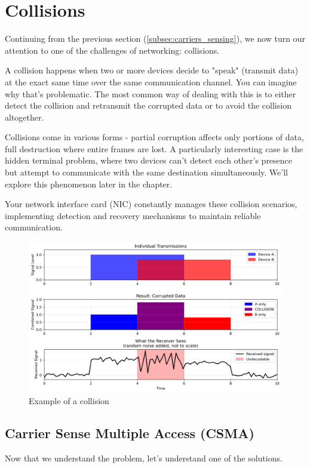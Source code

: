 \section{Collisions}\label{sec:collisions}
Continuing from the previous section (\ref{subsec:carriers_sensing}), we now turn our attention to one of the challenges of networking: collisions. 

A collision happens when two or more devices decide to "speak" (transmit data) at the exact same time over the same communication channel. You can imagine why that's problematic. The most common way of dealing with this is to either detect the collision and retransmit the corrupted data or to avoid the collision altogether.

Collisions come in various forms - partial corruption affects only portions of data, full destruction where entire frames are lost. A particularly interesting case is the hidden terminal problem, where two devices can't detect each other's presence but attempt to communicate with the same destination simultaneously. We'll explore this phenomenon later in the chapter.

Your network interface card (NIC) constantly manages these collision scenarios, implementing detection and recovery mechanisms to maintain reliable communication.
\vfill
\begin{figure}[h]
    \centering
    \includegraphics[width=\textwidth]{assets/diagrams/csma/collisions.png}
    \caption{Example of a collision}
    \label{fig:collision_visualization}
\end{figure}

\newpage
\subsection{Carrier Sense Multiple Access (CSMA)}
Now that we understand the problem, let's understand one of the solutions.

